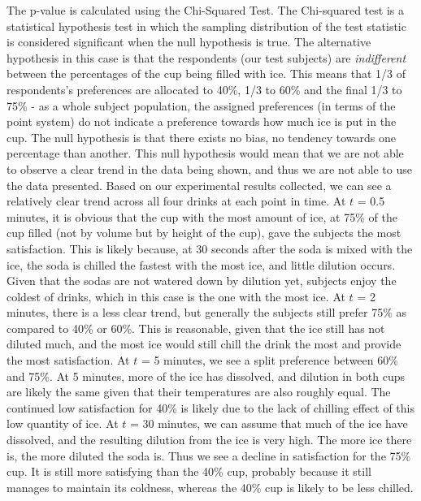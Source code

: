 \documentclass[oneside,12pt]{report}
\begin{document}
\vspace{12pt}
\newline
The p-value is calculated using the Chi-Squared Test. The Chi-squared test is a statistical hypothesis test in which the sampling distribution of the test statistic is considered significant when the null hypothesis is true. The alternative hypothesis in this case is that the respondents (our test subjects) are \emph{indifferent} between the percentages of the cup being filled with ice. This means that 1/3 of respondents's preferences are allocated to  40\%, 1/3 to 60\% and the final 1/3 to 75\% - as a whole subject population, the assigned preferences (in terms of the point system) do not indicate a preference towards how much ice is put in the cup. The null hypothesis is that there exists no bias, no tendency towards one percentage than another. This null hypothesis would mean that we are not able to observe a clear trend in the data being shown, and thus we are not able to use the data presented. 
\vspace{12pt}
\newline
Based on our experimental results collected, we can see a relatively clear trend across all four drinks at each point in time. 
\vspace{12pt}
\newline
At $t$ = 0.5 minutes, it is obvious that the cup with the most amount of ice, at 75\% of the cup filled (not by volume but by height of the cup), gave the subjects the most satisfaction. This is likely because, at 30 seconds after the soda is mixed with the ice, the soda is chilled the fastest with the most ice, and little dilution occurs. Given that the sodas are not watered down by dilution yet, subjects enjoy the coldest of drinks, which in this case is the one with the most ice. 
\vspace{12pt}
\newline
At $t$ = 2 minutes, there is a less clear trend, but generally the subjects still prefer 75\% as compared to 40\% or 60\%. This is reasonable, given that the ice still has not diluted much, and the most ice would still chill the drink the most and provide the most satisfaction. 
\vspace{12pt}
\newline
At $t$ = 5 minutes, we see a split preference between 60\% and 75\%. At 5 minutes, more of the ice has dissolved, and dilution in both cups are likely the same given that their temperatures are also roughly equal. The continued low satisfaction for 40\% is likely due to the lack of chilling effect of this low quantity of ice.
\vspace{12pt}
\newline
At $t$ = 30 minutes, we can assume that much of the ice have dissolved, and the resulting dilution from the ice is very high. The more ice there is, the more diluted the soda is. Thus we see a decline in satisfaction for the 75\% cup. It is still more satisfying than the 40\% cup, probably because it still manages to maintain its coldness, whereas the 40\% cup is likely to be less chilled. 
\end{document}
